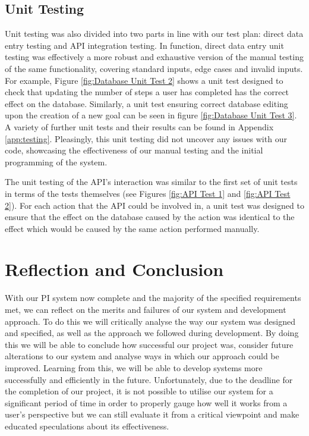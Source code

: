 \documentclass[11pt]{article}
\begin{document}
\subsection{Unit Testing}
Unit testing was also divided into two parts in line with our test plan: 
direct data entry testing and API integration testing. In function, direct 
data entry unit testing was effectively a more robust and exhaustive version 
of the manual testing of the same functionality, covering standard inputs, 
edge cases and invalid inputs. For example, Figure \ref{fig:Database Unit Test 2} 
shows a unit test designed to check that updating the number of steps a user has 
completed has the correct effect on the database. Similarly, a unit test 
ensuring correct database editing upon the creation of a new goal can be seen 
in figure \ref{fig:Database Unit Test 3}. A variety of further unit tests and 
their results can be found in Appendix \ref{app:testing}. Pleasingly, this unit 
testing did not uncover any issues with our code, showcasing the effectiveness of 
our manual testing and the initial programming of the system.\par

The unit testing of the API's interaction was similar to the first set of unit
tests in terms of the tests themselves (see Figures \ref{fig:API Test 1} and
\ref{fig:API Test 2}). For each action that the API could be involved in, a
unit test was designed to ensure that the effect on the database caused by the
action was identical to the effect which would be caused by the same action
performed manually.\par

\section{Reflection and Conclusion}

With our PI system now complete and the majority of the specified requirements met, we can 
reflect on the merits and failures of our system and development approach. To do 
this we will critically analyse the way our system was designed and specified, 
as well as the approach we followed during development. By doing this we will 
be able to conclude how successful our project was, consider
future alterations to our system and analyse ways in which our approach could 
be improved. Learning from this, we will be able to develop systems more 
successfully and efficiently in the future. Unfortunately, due to the deadline for the 
completion of our  project, it is not possible to utilise our system for a
significant period of time in order to properly gauge how well it works from 
a user's perspective but we can still evaluate it from a critical viewpoint 
and make educated speculations about its effectiveness.\par
\end{document}
